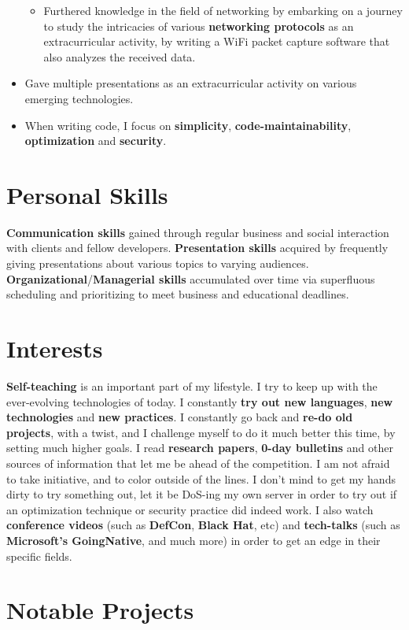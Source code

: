 \documentclass[11pt,a4paper,sans]{moderncv}
\begin{document}
\begin{itemize}
\begin{itemize}
		\item	Furthered knowledge in the field of networking by embarking on a journey to study the intricacies of various \textbf{networking protocols} as an extracurricular activity, by writing a WiFi packet capture software that also analyzes the received data.
		\end{itemize}
	\item	Gave multiple presentations as an extracurricular activity on various emerging technologies.
	\item	When writing code, I focus on \textbf{simplicity}, \textbf{code-maintainability}, \textbf{optimization} and \textbf{security}.
	\end{itemize}

\section{Personal Skills}
	\textbf{Communication skills} gained through regular business and social interaction with clients and fellow developers. \textbf{Presentation skills} acquired by frequently giving presentations about various topics to varying audiences. \textbf{Organizational}/\textbf{Managerial skills} accumulated over time via superfluous scheduling and prioritizing to meet business and educational deadlines.

\section{Interests}
	\textbf{Self-teaching} is an important part of my lifestyle. I try to keep up with the ever-evolving technologies of today. I constantly \textbf{try out new languages}, \textbf{new technologies} and \textbf{new practices}. I constantly go back and \textbf{re-do old projects}, with a twist, and I challenge myself to do it much better this time, by setting much higher goals. I read \textbf{research papers}, \textbf{0-day bulletins} and other sources of information that let me be ahead of the competition. I am not afraid to take initiative, and to color outside of the lines. I don't mind to get my hands dirty to try something out, let it be DoS-ing my own server in order to try out if an optimization technique or security practice did indeed work. I also watch \textbf{conference videos} (such as \textbf{DefCon}, \textbf{Black Hat}, etc) and \textbf{tech-talks} (such as \textbf{Microsoft's GoingNative}, and much more) in order to get an edge in their specific fields.

\section{Notable Projects}
\end{document}
